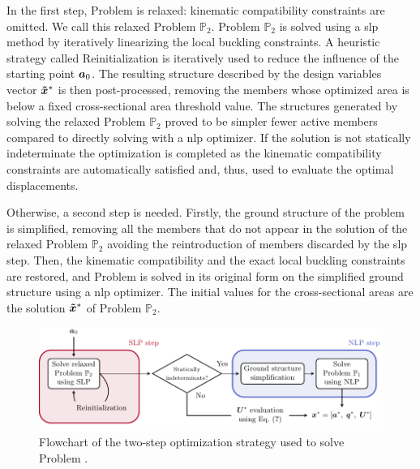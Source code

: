 In the first step, Problem  is relaxed: kinematic compatibility constraints are omitted. We call this relaxed Problem $\mathbb{P}_2$. Problem $\mathbb{P}_2$ is solved using a \gls{slp} method by iteratively linearizing the local buckling constraints. A heuristic strategy called Reinitialization is iteratively used to reduce the influence of the starting point $\bm{a}_0$. The resulting structure described by the design variables vector $\bm{\tilde{x}}^*$ is then post-processed, removing the members whose optimized area is below a fixed cross-sectional area threshold value. The structures generated by solving the relaxed Problem $\mathbb{P}_2$ proved to be simpler \ie fewer active members compared to directly solving  with a \gls{nlp} optimizer. If the solution is not statically indeterminate the optimization is completed as the kinematic compatibility constraints  are automatically satisfied and, thus, used to evaluate the optimal displacements.

Otherwise, a second step is needed. Firstly, the ground structure of the problem is simplified, removing all the members that do not appear in the solution of the relaxed Problem $\mathbb{P}_2$ \ie avoiding the reintroduction of members discarded by the \gls{slp} step. Then, the kinematic compatibility and the exact local buckling constraints are restored, and Problem  is solved in its original form on the simplified ground structure using a \gls{nlp} optimizer. The initial values for the cross-sectional areas are the solution $\bm{\tilde{x}}^*$ of Problem $\mathbb{P}_2$.

\begin{figure}
    \centering
    \includegraphics[width=\textwidth]{figures/04_TTO_improvements/02_solution_algo/sol_algo.pdf}
    \caption{Flowchart of the two-step optimization strategy used to solve Problem .}
    \label{fig:sol_alg}
\end{figure}

